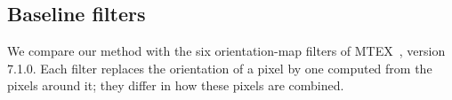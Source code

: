 
\subsection{Baseline filters}
\label{sec:baselines}

We compare our method with the six orientation-map filters of
MTEX~\cite{bachmann2010mtex,hielscher2019denoising}, version 7.1.0. Each
filter replaces the orientation of a pixel by one computed from the pixels
around it; they differ in how these pixels are combined.

